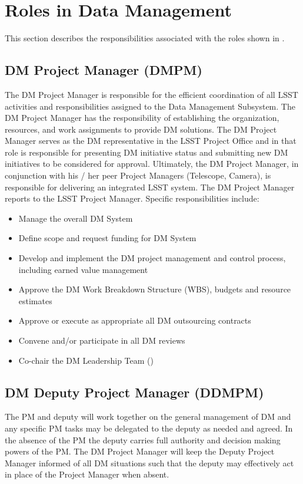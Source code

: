 \section{Roles in Data Management}

This section describes the responsibilities associated with the roles shown in
.


\subsection{DM Project Manager (DMPM)\label{role:dmpm}}

The DM Project Manager is responsible for the efficient coordination of all LSST activities and responsibilities assigned to the Data Management Subsystem. The DM Project Manager has the responsibility of establishing the organization, resources, and work assignments to provide DM solutions.  The DM Project Manager serves as the DM representative in the LSST Project Office and in that role is responsible for presenting DM initiative status and submitting new DM initiatives to be considered for approval. Ultimately, the DM Project Manager, in conjunction with his / her peer Project Managers (Telescope, Camera), is responsible for delivering an integrated LSST system. The DM Project Manager reports to the LSST Project Manager. Specific responsibilities include:

\begin{itemize}
\item Manage the overall DM System
\item Define scope and request funding for DM System
\item Develop and implement the DM project management and control process, including earned value management
\item Approve the DM Work Breakdown Structure (WBS), budgets and resource estimates
\item Approve or execute as appropriate all DM outsourcing contracts
\item Convene and/or participate in all DM reviews
\item Co-chair the DM Leadership Team ()
\end{itemize}

\subsection{DM Deputy Project Manager (DDMPM) \label{role:dmdpm}}
The PM and deputy will work together on the general management of DM and any specific PM tasks may be delegated to the deputy as needed and agreed. In the absence of the PM the deputy carries full authority and decision making powers of the PM. The DM Project Manager will keep the Deputy Project Manager informed of all DM situations such that the deputy may effectively act in place of the Project Manager when absent.

